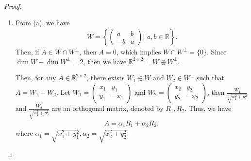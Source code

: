 \documentclass[11pt]{article}
\theoremstyle{definition}
\numberwithin{equation}{subsection}
\begin{document}
\begin{proof}
\begin{enumerate}[label=(\alph*)]
    \item From (a), we have
    \begin{align*}
        W = \left\{\begin{pmatrix} a & b \\ -b & a \end{pmatrix} \Bigg| \,\, a, b \in \mathbb{R} \right\}.
    \end{align*}
    Then, if $A \in W \cap W^\bot$, then $A = 0$, which implies $W \cap W^\bot = \{0\}$. Since $\dim W + \dim W^\bot = 2$, then we have $\mathbb{R}^{2 \times 2} = W \oplus W^\bot$.
    
    Then, for any $A \in \mathbb{R}^{2 \times 2}$, there exists $W_1 \in W$ and $W_2 \in W^\bot$ such that $A = W_1 + W_2$. Let $W_1 = \begin{pmatrix} x_1 & y_1 \\ y_1 & -x_1 \end{pmatrix}$ and $W_2 = \begin{pmatrix} x_2 & y_2 \\ y_2 & -x_2 \end{pmatrix}$, then $\frac{W_1}{\sqrt{x_1^2 + y_1^2}}$ and $\frac{W_2}{\sqrt{x_2^2 + y_2^2}}$ are an orthogonal matrix, denoted by $R_1, R_2$. Thus, we have
    \begin{align*}
        A = \alpha_1 R_1 + \alpha_2 R_2,
    \end{align*}
    where $\alpha_1 = \sqrt{x_1^2 + y_1^2}, \alpha_2 = \sqrt{x_2^2 + y_2^2}$.
\end{enumerate}
\end{proof}

\medskip
\end{document}
